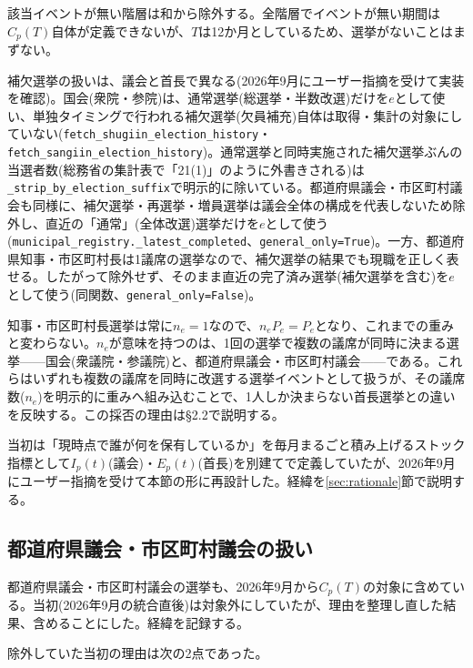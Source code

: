 \documentclass[a4paper,11pt]{ltjsarticle}
\begin{document}
該当イベントが無い階層は和から除外する。全階層でイベントが無い期間は$C_p(T)$自体が定義できないが、$T$は12か月としているため、選挙がないことはまずない。

補欠選挙の扱いは、議会と首長で異なる(2026年9月にユーザー指摘を受けて実装を確認)。国会(衆院・参院)は、通常選挙(総選挙・半数改選)だけを$e$として使い、単独タイミングで行われる補欠選挙(欠員補充)自体は取得・集計の対象にしていない(\texttt{fetch\_shugiin\_election\_history}・\texttt{fetch\_sangiin\_election\_history})。通常選挙と同時実施された補欠選挙ぶんの当選者数(総務省の集計表で「21(1)」のように外書きされる)は\texttt{\_strip\_by\_election\_suffix}で明示的に除いている。都道府県議会・市区町村議会も同様に、補欠選挙・再選挙・増員選挙は議会全体の構成を代表しないため除外し、直近の「通常」(全体改選)選挙だけを$e$として使う(\texttt{municipal\_registry.\_latest\_completed}、\texttt{general\_only=True})。一方、都道府県知事・市区町村長は1議席の選挙なので、補欠選挙の結果でも現職を正しく表せる。したがって除外せず、そのまま直近の完了済み選挙(補欠選挙を含む)を$e$として使う(同関数、\texttt{general\_only=False})。

知事・市区町村長選挙は常に$n_e=1$なので、$n_eP_e=P_e$となり、これまでの重みと変わらない。$n_e$が意味を持つのは、1回の選挙で複数の議席が同時に決まる選挙——国会(衆議院・参議院)と、都道府県議会・市区町村議会——である。これらはいずれも複数の議席を同時に改選する選挙イベントとして扱うが、その議席数($n_e$)を明示的に重みへ組み込むことで、1人しか決まらない首長選挙との違いを反映する。この採否の理由は\S2.2で説明する。

当初は「現時点で誰が何を保有しているか」を毎月まるごと積み上げるストック指標として$I_p(t)$(議会)・$E_p(t)$(首長)を別建てで定義していたが、2026年9月にユーザー指摘を受けて本節の形に再設計した。経緯を\ref{sec:rationale}節で説明する。

\subsection{都道府県議会・市区町村議会の扱い}
\label{sec:ip-definition}

都道府県議会・市区町村議会の選挙も、2026年9月から$C_p(T)$の対象に含めている。当初(2026年9月の統合直後)は対象外にしていたが、理由を整理し直した結果、含めることにした。経緯を記録する。

除外していた当初の理由は次の2点であった。
\end{document}

